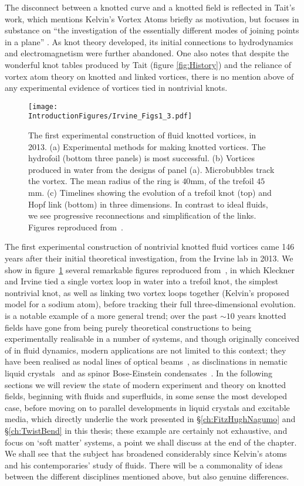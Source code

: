 The disconnect between a knotted curve and a knotted field is reflected in Tait's work, which mentions Kelvin's Vortex Atoms briefly as motivation, but focuses in substance on ``the investigation of the essentially different modes of joining points in a plane'' \citep{Tait1}. As knot theory developed, its initial connections to hydrodynamics and electromagnetism were further abandoned. One also notes that despite the wonderful knot tables produced by Tait (figure \ref{fig:History}) and the reliance of vortex atom theory on knotted and linked vortices, there is no mention above of any experimental evidence of vortices tied in nontrivial knots. 
\begin{figure}[htbp]
\centering
\texttt{[image: \\IntroductionFigures/Irvine\_Figs1\_3.pdf]}
\caption[The first experimental construction of fluid knotted vortices.]{The first experimental construction of fluid knotted vortices, in 2013. (a) Experimental methods for making knotted vortices. The hydrofoil (bottom three panels) is most successful. (b) Vortices produced in water from the designs of panel (a). Microbubbles track the vortex. The mean radius of the ring is $40$mm, of the trefoil $45$mm. (c) Timelines showing the evolution of a trefoil knot (top) and Hopf link (bottom) in three dimensions. In contrast to ideal fluids, we see progressive reconnections and simplification of the links. Figures reproduced from~\citep{Kleckner2013}.}
\label{fig:Irvine}
\end{figure}

The first experimental construction of nontrivial knotted fluid vortices came 146 years after their initial theoretical investigation, from the Irvine lab in 2013. We show in figure~\ref{fig:Irvine} several remarkable figures reproduced from~\citep{Kleckner2013}, in which Kleckner and Irvine tied a single vortex loop in water into a trefoil knot, the simplest nontrivial knot, as well as linking two vortex loops together (Kelvin's proposed model for a sodium atom), before tracking their full three-dimensional evolution.~\citep{Kleckner2013} is a notable example of a more general trend; over the past $\sim10$ years knotted fields have gone from being purely theoretical constructions to being experimentally realisable in a number of systems, and though originally conceived of in fluid dynamics, modern applications are not limited to this context; they have been realised as nodal lines of optical beams~\citep{Dennis2010}, as disclinations in nematic liquid crystals~\citep{Tkalec2011,Tasinkevych2014,Copar2015} and as spinor Bose-Einstein condensates~\citep{Hall2016}. In the following sections we will review the state of modern experiment and theory on knotted fields, beginning with fluids and superfluids, in some sense the most developed case, before moving on to parallel developments in liquid crystals and excitable media, which directly underlie the work presented in \S \ref{ch:FitzHughNagumo} and \S \ref{ch:TwistBend} in this thesis; these example are certainly not exhaustive, and focus on `soft matter' systems, a point we shall discuss at the end of the chapter. We shall see that the subject has broadened considerably since Kelvin's atoms and his contemporaries' study of fluids. There will be a commonality of ideas between the different disciplines mentioned above, but also genuine differences.
